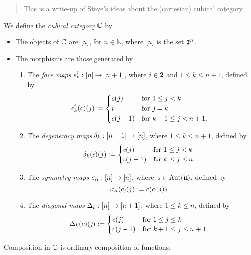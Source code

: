 \documentclass{article}
\begin{document}
\begin{abstract}
This is a write-up of Steve's ideas about the (cartesian) cubical category.
\end{abstract}

\begin{defn}
We define the \emph{cubical category} $\mathbb{C}$ by
\begin{itemize}
\item The objects of $\mathbb{C}$ are $[n]$, for $n\in\mathbb{N}$, where $[n]$ is the set $\mathbf{2}^n$.
\item The morphisms are those generated by
\begin{enumerate}
\item The \emph{face maps} $\epsilon_{k}^{i}:[n]\to[n+1]$, where $i\in \mathbf{2}$ and
$1\leq k\leq n+1$, defined by
\begin{equation*}
\epsilon_{k}^{i}(c)(j) :=
\begin{cases}
c(j) & \text{for }1\leq j<k\\
i & \text{for }j=k\\
c(j-1) & \text{for }k+1\leq j<n+1.
\end{cases}
\end{equation*}
\item The \emph{degeneracy maps} $\delta_{k}:[n+1]\to[n]$, where
$1\leq k\leq n+1$, defined by
\begin{equation*}
\delta_{k}(c)(j) :=
\begin{cases}
c(j) & \text{for }1\leq j<k\\
c(j+1) & \text{for }k\leq j\leq n.
\end{cases}
\end{equation*}
\item The \emph{symmetry maps} $\sigma_{\alpha}:[n]\to[n]$, where
$\alpha\in\mathrm{Aut}(\mathbf{n})$, defined by
\begin{equation*}
\sigma_{\alpha}(c)(j):= c(\alpha(j)).
\end{equation*}
\item The \emph{diagonal maps} $\Delta_{k}:[n]\to[n+1]$, where
$1\leq k\leq n$, defined by
\begin{equation*}
\Delta_{k}(c)(j) :=
\begin{cases}
c(j) & \text{for }1\leq j\leq k\\
c(j-1) & \text{for }k+1\leq j\leq n+1.
\end{cases}
\end{equation*}
\end{enumerate}
\end{itemize}
Composition in $\mathbb{C}$ is ordinary composition of functions.
\end{defn}
\end{document}
